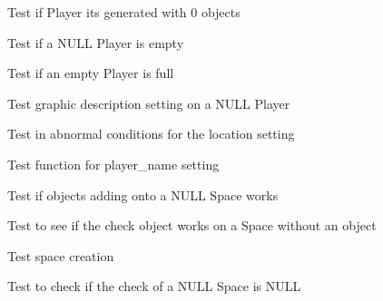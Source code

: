 \begin{DoxyRefList}
\item[\label{test__test000192}%
\hypertarget{test__test000192}{}%
Member \hyperlink{player__test_8h_a718933fd0429cdc840c6624882550d3b}{test2\+\_\+player\+\_\+get\+\_\+objects\+\_\+number} ()]Test if Player its generated with 0 objects  
\item[\label{test__test000203}%
\hypertarget{test__test000203}{}%
Member \hyperlink{player__test_8h_ab101e35e3034e348688b0a8ffd81f8ad}{test2\+\_\+player\+\_\+is\+\_\+empty} ()]Test if a N\+U\+LL Player is empty  
\item[\label{test__test000206}%
\hypertarget{test__test000206}{}%
Member \hyperlink{player__test_8h_a2a0781d2fbfb7f0d8870b7501db230a6}{test2\+\_\+player\+\_\+is\+\_\+full} ()]Test if an empty Player is full  
\item[\label{test__test000178}%
\hypertarget{test__test000178}{}%
Member \hyperlink{player__test_8h_a4d18de1dc3a06db35a47aaa2c81df4fd}{test2\+\_\+player\+\_\+set\+\_\+graphic\+\_\+description} ()]Test graphic description setting on a N\+U\+LL Player  
\item[\label{test__test000181}%
\hypertarget{test__test000181}{}%
Member \hyperlink{player__test_8h_a2c702753d9e2e3df9ef4abf2d1b9bc8d}{test2\+\_\+player\+\_\+set\+\_\+location} ()]Test in abnormal conditions for the location setting  
\item[\label{test__test000175}%
\hypertarget{test__test000175}{}%
Member \hyperlink{player__test_8h_a6e7ce8ff791f4bf63749df647a44263f}{test2\+\_\+player\+\_\+set\+\_\+name} ()]Test function for player\+\_\+name setting  
\item[\label{test__test000254}%
\hypertarget{test__test000254}{}%
Member \hyperlink{space__test_8h_af5de291847d272d79a524c30b96f6f0c}{test2\+\_\+space\+\_\+add\+\_\+object} ()]Test if objects adding onto a N\+U\+LL Space works  
\item[\label{test__test000263}%
\hypertarget{test__test000263}{}%
Member \hyperlink{space__test_8h_a38e4abfa3cee772d0c0ecedb73ee98c1}{test2\+\_\+space\+\_\+check\+\_\+object} ()]Test to see if the check object works on a Space without an object  
\item[\label{test__test000213}%
\hypertarget{test__test000213}{}%
Member \hyperlink{space__test_8h_a012cd3cf37a8d91e2d7098a264c29d65}{test2\+\_\+space\+\_\+create} ()]Test space creation  
\item[\label{test__test000246}%
\hypertarget{test__test000246}{}%
Member \hyperlink{space__test_8h_ae1e71883c15a97ec2b6d16ddbf77f301}{test2\+\_\+space\+\_\+get\+\_\+check} ()]Test to check if the check of a N\+U\+LL Space is N\+U\+LL  

\end{DoxyRefList}
